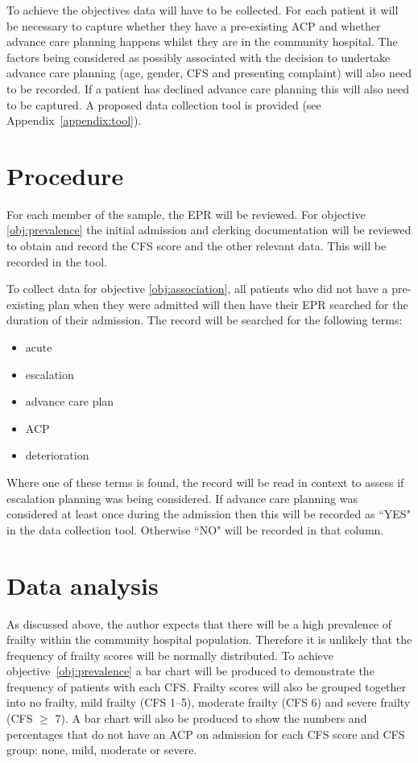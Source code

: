\documentclass
[
	12pt,
	a4paper,
	oneside,
]{article}
\begin{document}
To achieve the objectives data will have to be collected. For each patient it 
will be necessary to capture whether they have a pre-existing
ACP and whether advance care planning happens whilst they are in the community
hospital. The factors being considered as possibly associated with the decision to
undertake advance care planning (age, gender, CFS and presenting complaint) will
also need to be recorded. If a patient has declined advance care planning this will
also need to be captured. A proposed data collection tool is provided
(see Appendix~\ref{appendix:tool}).

\section{Procedure}
\label{sec:procedure}
For each member of the sample, the EPR will be reviewed. 
For objective \ref{obj:prevalence} 
the initial admission and clerking documentation will be reviewed to obtain and
record the CFS score and the other relevant data. This will be recorded in the tool.


To collect data for objective \ref{obj:association}, all patients who did not have
a pre-existing plan when they were admitted will then have their EPR searched
for the duration of their admission. The record will be searched for the following
terms:

\begin{itemize}
\item acute
\item escalation
\item advance care plan
\item ACP
\item deterioration
\end{itemize}

Where one of these terms is found, the record will be read in context to assess if 
escalation planning was being considered. If advance care planning 
was considered at least once during the admission then this will be recorded as ``YES"
in the data collection tool. Otherwise ``NO" will be recorded in that column.

\section{Data analysis}
As discussed above, the author expects that there will be a high prevalence of frailty 
within the community hospital population. Therefore it is unlikely that the frequency
of frailty scores will be normally distributed. To achieve objective~\ref{obj:prevalence}
a bar chart will be produced to demonstrate the frequency of patients with each CFS.
Frailty scores will also be grouped together into no frailty, mild frailty (CFS 1--5),
moderate frailty (CFS 6) and severe frailty (CFS $\geq$ 7). A bar chart will also 
be produced to show the numbers and percentages that do not have an ACP on admission
for each CFS score and CFS group: none, mild, moderate or severe.
\end{document}
